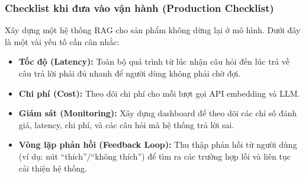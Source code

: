 \subsubsection{Checklist khi đưa vào vận hành (Production Checklist)}
Xây dựng một hệ thống RAG cho sản phẩm không dừng lại ở mô hình. Dưới đây là một vài yếu tố cần cân nhắc:
\begin{itemize}
	\item \textbf{Tốc độ (Latency):} Toàn bộ quá trình từ lúc nhận câu hỏi đến lúc trả về câu trả lời phải đủ nhanh để người dùng không phải chờ đợi.
	\item \textbf{Chi phí (Cost):} Theo dõi chi phí cho mỗi lượt gọi API embedding và LLM.
	\item \textbf{Giám sát (Monitoring):} Xây dựng dashboard để theo dõi các chỉ số đánh giá, latency, chi phí, và các câu hỏi mà hệ thống trả lời sai.
	\item \textbf{Vòng lặp phản hồi (Feedback Loop):} Thu thập phản hồi từ người dùng (ví dụ: nút “thích”/“không thích”) để tìm ra các trường hợp lỗi và liên tục cải thiện hệ thống.
\end{itemize}

